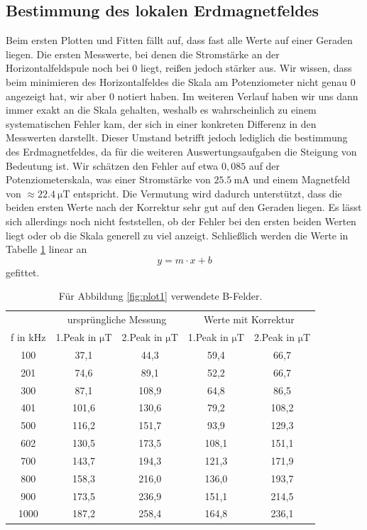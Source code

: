 \documentclass[
  bibliography=totoc,     %
  captions=tableheading,  %
  titlepage=firstiscover, %
]{scrartcl}
\begin{document}
\subsection{Bestimmung des lokalen Erdmagnetfeldes}
Beim ersten Plotten und Fitten fällt auf, dass fast alle Werte auf einer Geraden liegen.
Die ersten Messwerte, bei denen die Stromstärke an der Horizontalfeldspule noch bei 0 liegt,
reißen jedoch stärker aus. Wir wissen, dass beim minimieren des Horizontalfeldes
die Skala am Potenziometer nicht genau 0 angezeigt hat, wir aber 0 notiert haben.
Im weiteren Verlauf haben wir uns dann immer exakt an die Skala gehalten, weshalb es
wahrscheinlich zu einem systematischen Fehler kam, der sich in einer konkreten Differenz
in den Messwerten darstellt. Dieser Umstand betrifft jedoch lediglich die bestimmung des
Erdmagnetfeldes, da für die weiteren Auswertungsaufgaben die Steigung von
Bedeutung ist. Wir schätzen den Fehler auf etwa $0,085$ auf der Potenziometerskala,
was einer Stromstärke von $\SI{25.5}{\milli\ampere}$ und einem Magnetfeld von $\approx\SI{22.4}{\micro\tesla}$ entspricht. Die Vermutung wird dadurch
unterstützt, dass die beiden ersten Werte nach der Korrektur sehr gut auf den
Geraden liegen. Es lässt sich allerdings noch nicht feststellen, ob der Fehler bei den
ersten beiden Werten liegt oder ob die Skala generell zu viel anzeigt.
Schließlich werden die Werte in Tabelle \ref{tab:4} linear an
\begin{equation}
  y = m \cdot x + b
\end{equation}
gefittet.
\begin{table}[H]
  \centering
  \caption{Für Abbildung \ref{fig:plot1} verwendete B-Felder.}
  \label{tab:4}
  \begin{tabular}{c c c c c}
    \toprule
    & \multicolumn{2}{c}{ursprüngliche Messung} & \multicolumn{2}{c}{Werte mit Korrektur}\\
    f in \si{\kilo\hertz} & 1.Peak in $\si{\micro\tesla}$ & 2.Peak in $\si{\micro\tesla}$ & 1.Peak in $\si{\micro\tesla}$ & 2.Peak in $\si{\micro\tesla}$ \\
    \midrule
    100  &  37,1 &  44,3 &  59,4 &  66,7 \\
    201  &  74,6 &  89,1 &  52,2 &  66,7 \\
    300  &  87,1 & 108,9 &  64,8 &  86,5 \\
    401  & 101,6 & 130,6 &  79,2 & 108,2 \\
    500  & 116,2 & 151,7 &  93,9 & 129,3 \\
    602  & 130,5 & 173,5 & 108,1 & 151,1 \\
    700  & 143,7 & 194,3 & 121,3 & 171,9 \\
    800  & 158,3 & 216,0 & 136,0 & 193,7 \\
    900  & 173,5 & 236,9 & 151,1 & 214,5 \\
    1000 & 187,2 & 258,4 & 164,8 & 236,1 \\
    \bottomrule
  \end{tabular}
\end{table}
\end{document}
